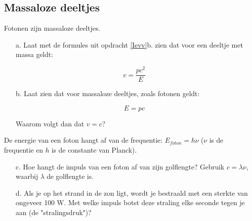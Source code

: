 \subsection{Massaloze deeltjes}
Fotonen zijn massaloze deeltjes.
\begin{itemize}
\item [a.]
Laat met de formules uit opdracht \ref{Ievv}b. zien dat voor een deeltje met massa geldt:

\begin{equation}
	v=\frac{pc^2}{E} \nonumber
\end{equation}

\item [b.]
Laat zien dat voor massaloze deeltjes, zoals fotonen geldt:

\begin{equation}
	E=pc \nonumber
\end{equation}

Waarom volgt dan dat $v=c$?

\end{itemize}
De energie van een foton hangt af van de frequentie: $E_{foton} = h\nu$ 
($\nu$ is de frequentie en $h$ is de constante van Planck).
\begin{itemize}
\item [c.]
Hoe hangt de impuls van een foton af van zijn golflengte?
Gebruik $c = \lambda\nu$, waarbij $\lambda$ de golflengte is.
\item [d.]
Als je op het strand in de zon ligt, wordt je bestraald met een sterkte van 
ongeveer 100 W.
Met welke impuls botst deze straling elke seconde tegen je aan (de 
"stralingsdruk")?
\end{itemize}

